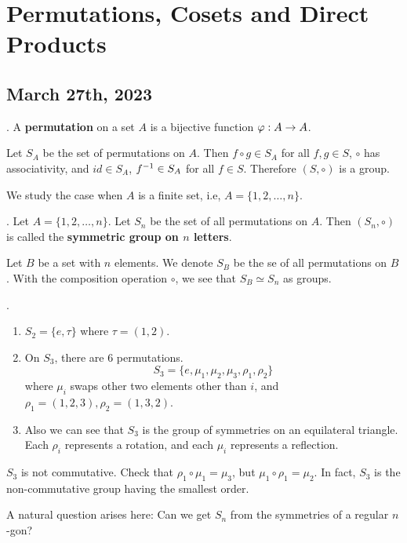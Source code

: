 \chapter{Permutations, Cosets and Direct Products}

\section*{March 27th, 2023}

\setcounter{topic}{7}

.  A \textbf{permutation} on a set \(A\) is a bijective function \(\varphi: A \rightarrow A\).

\rmk Let \(S_A\) be the set of permutations on \(A\). Then \(f \circ g \in S_A\) for all \(f, g \in S\), \(\circ\) has associativity, and \(id \in S_A\), \(f^{-1} \in S_A\) for all \(f \in S\). Therefore \((S, \circ)\) is a group.

We study the case when \(A\) is a finite set, i.e, \(A = \{1, 2, \dots, n\}\).

.  Let \(A = \{1, 2, \dots, n\}\). Let \(S_n\) be the set of all permutations on \(A\). Then \((S_n, \circ)\) is called the \textbf{symmetric group on \(n\) letters}.

Let \(B\) be a set with \(n\) elements. We denote \(S_B\) be the se of all permutations on \(B\). With the composition operation \(\circ\), we see that \(S_B \simeq S_n\) as groups.

\ex.
\begin{enumerate}
    \item \(S_2 = \{e, \tau\}\) where \(\tau = (1, 2)\).
    \item On \(S_3\), there are 6 permutations.
          \[
              S_3 = \{e, \mu_1, \mu_2, \mu_3, \rho_1, \rho_2\}
          \]
          where \(\mu_i\) swaps other two elements other than \(i\), and \(\rho_1 = (1, 2, 3), \rho_2 = (1, 3, 2)\).
    \item Also we can see that \(S_3\) is the group of symmetries on an equilateral triangle. Each \(\rho_i\) represents a rotation, and each \(\mu_i\) represents a reflection.
\end{enumerate}

\rmk \(S_3\) is not commutative. Check that \(\rho_1 \circ \mu_1 = \mu_3\), but \(\mu_1 \circ \rho_1 = \mu_2\). In fact, \(S_3\) is the non-commutative group having the smallest order.

A natural question arises here: Can we get \(S_n\) from the symmetries of a regular \(n\)-gon?

